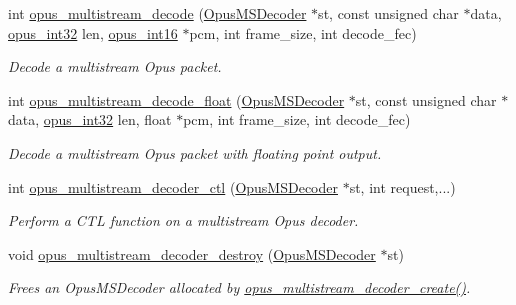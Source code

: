 \begin{DoxyCompactItemize}
int \hyperlink{group__opus__multistream_gaa4b89541efe01970cf52e4a336db3ad0}{opus\+\_\+multistream\+\_\+decode} (\hyperlink{group__opus__multistream_gad3497495deb9a8ace82e76cd4f93e0e4}{Opus\+M\+S\+Decoder} $\ast$st, const unsigned char $\ast$data, \hyperlink{opus__types_8h_aa4d309d6f80b99dbabebc8f98879ab9a}{opus\+\_\+int32} len, \hyperlink{opus__types_8h_acc9ed7cf60479eb81f9648c6ec27dc26}{opus\+\_\+int16} $\ast$pcm, int frame\+\_\+size, int decode\+\_\+fec)
\begin{DoxyCompactList}\small\item\em Decode a multistream Opus packet. \end{DoxyCompactList}\item 
int \hyperlink{group__opus__multistream_ga620e67c67872f8ea0b67a200c729630a}{opus\+\_\+multistream\+\_\+decode\+\_\+float} (\hyperlink{group__opus__multistream_gad3497495deb9a8ace82e76cd4f93e0e4}{Opus\+M\+S\+Decoder} $\ast$st, const unsigned char $\ast$data, \hyperlink{opus__types_8h_aa4d309d6f80b99dbabebc8f98879ab9a}{opus\+\_\+int32} len, float $\ast$pcm, int frame\+\_\+size, int decode\+\_\+fec)
\begin{DoxyCompactList}\small\item\em Decode a multistream Opus packet with floating point output. \end{DoxyCompactList}\item 
int \hyperlink{group__opus__multistream_ga4b3dca8d46e5868cc133f3f6d2b57688}{opus\+\_\+multistream\+\_\+decoder\+\_\+ctl} (\hyperlink{group__opus__multistream_gad3497495deb9a8ace82e76cd4f93e0e4}{Opus\+M\+S\+Decoder} $\ast$st, int request,...)
\begin{DoxyCompactList}\small\item\em Perform a C\+TL function on a multistream Opus decoder. \end{DoxyCompactList}\item 
void \hyperlink{group__opus__multistream_gaaec72b484eabc78d7869221c6d2ce080}{opus\+\_\+multistream\+\_\+decoder\+\_\+destroy} (\hyperlink{group__opus__multistream_gad3497495deb9a8ace82e76cd4f93e0e4}{Opus\+M\+S\+Decoder} $\ast$st)
\begin{DoxyCompactList}\small\item\em Frees an {\ttfamily Opus\+M\+S\+Decoder} allocated by \hyperlink{group__opus__multistream_ga3c0e342774174c471e61cedba53755c9}{opus\+\_\+multistream\+\_\+decoder\+\_\+create()}. \end{DoxyCompactList}\end{DoxyCompactItemize}


